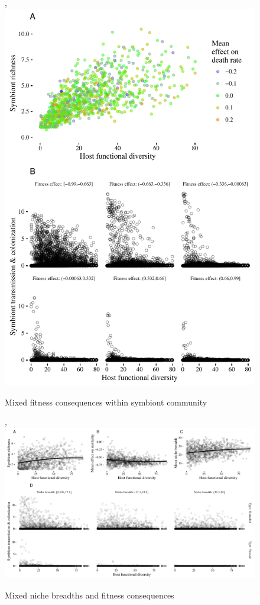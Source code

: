 \documentclass[12pt]{article}
\begin{document}
\begin{figure}[ht]\centering,
\includegraphics[width=\textwidth,height=\dimexpr\textheight-4\baselineskip-\abovecaptionskip-\belowcaptionskip\relax,
keepaspectratio]{fig/fig5.pdf}
\caption{Mixed fitness consequences within symbiont community}
\label{f6}
\end{figure}

\newpage

\begin{figure}[ht]\centering,
\includegraphics[width=\textwidth,height=\dimexpr\textheight-4\baselineskip-\abovecaptionskip-\belowcaptionskip\relax,
keepaspectratio]{fig/fig6.pdf}
\caption{Mixed niche breadths and fitness consequences}
\label{f7}
\end{figure}

\newpage
\end{document}
